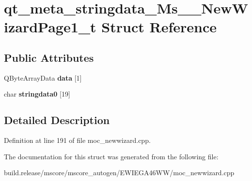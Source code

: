 \hypertarget{structqt__meta__stringdata___ms_____new_wizard_page1__t}{}\section{qt\+\_\+meta\+\_\+stringdata\+\_\+\+Ms\+\_\+\+\_\+\+New\+Wizard\+Page1\+\_\+t Struct Reference}
\label{structqt__meta__stringdata___ms_____new_wizard_page1__t}
\subsection*{Public Attributes}
\begin{DoxyCompactItemize}
\item 
\mbox{\label{structqt__meta__stringdata___ms_____new_wizard_page1__t_aa4ef520ca4ad74feef79ebc46093bc9f}} 
Q\+Byte\+Array\+Data {\bfseries data} \mbox{[}1\mbox{]}
\item 
\mbox{\label{structqt__meta__stringdata___ms_____new_wizard_page1__t_a2747a689c2dd2c784d28d903a0fa326d}} 
char {\bfseries stringdata0} \mbox{[}19\mbox{]}
\end{DoxyCompactItemize}


\subsection{Detailed Description}


Definition at line 191 of file moc\+\_\+newwizard.\+cpp.



The documentation for this struct was generated from the following file\+:\begin{DoxyCompactItemize}
\item 
build.\+release/mscore/mscore\+\_\+autogen/\+E\+W\+I\+E\+G\+A46\+W\+W/moc\+\_\+newwizard.\+cpp\end{DoxyCompactItemize}

